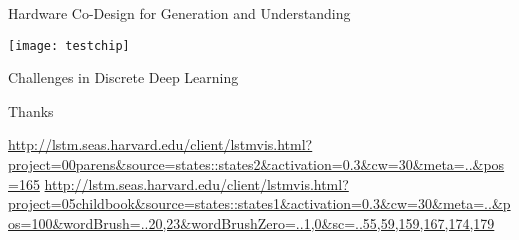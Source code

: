 \begin{frame}{Hardware Co-Design for Generation and Understanding}
\begin{center}
  \texttt{[image: testchip]}
\end{center}
\end{frame}

\begin{frame}{Challenges in Discrete Deep Learning}
  
\end{frame}




\begin{frame}
  Thanks
\end{frame}



\begin{frame}
  \url{http://lstm.seas.harvard.edu/client/lstmvis.html?project=00parens&source=states::states2&activation=0.3&cw=30&meta=..&pos=165}
  \url{http://lstm.seas.harvard.edu/client/lstmvis.html?project=05childbook&source=states::states1&activation=0.3&cw=30&meta=..&pos=100&wordBrush=..20,23&wordBrushZero=..1,0&sc=..55,59,159,167,174,179}

\end{frame}